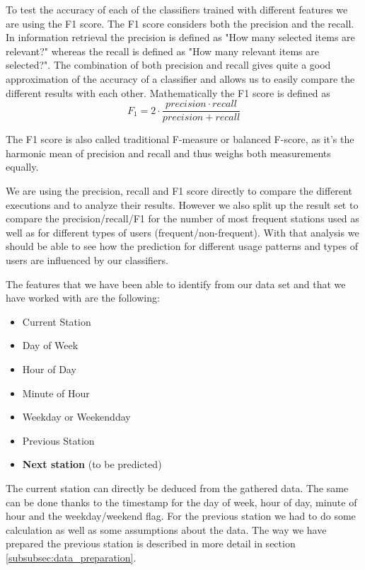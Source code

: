 To test the accuracy of each of the classifiers trained with different features we are using the F1 score. The F1 score considers both the precision and the recall. In information retrieval the precision is defined as "How many selected items are relevant?" whereas the recall is defined as "How many relevant items are selected?". The combination of both precision and recall gives quite a good approximation of the accuracy of a classifier and allows us to easily compare the different results with each other. Mathematically the F1 score is defined as 
\begin{equation}\label{equation:F1Score}
F_{1} = 2 \cdot \frac{precision \cdot recall}{precision + recall}
\end{equation}

The F1 score is also called traditional F-measure or balanced F-score, as it's the harmonic mean of precision and recall and thus weighs both measurements equally.

We are using the precision, recall and F1 score directly to compare the different executions and to analyze their results. However we also split up the result set to compare the precision/recall/F1 for the number of most frequent stations used as well as for different types of users (frequent/non-frequent). With that analysis we should be able to see how the prediction for different usage patterns and types of users are influenced by our classifiers.

The features that we have been able to identify from our data set and that we have worked with are the following:
\begin{itemize}
	\item Current Station
	\item Day of Week
	\item Hour of Day
	\item Minute of Hour
	\item Weekday or Weekendday
	\item Previous Station
	\item \textbf{Next station} (to be predicted)
\end{itemize}

The current station can directly be deduced from the gathered data. The same can be done thanks to the timestamp for the day of week, hour of day, minute of hour and the weekday/weekend flag. For the previous station we had to do some calculation as well as some assumptions about the data. The way we have prepared the previous station is described in more detail in section \ref{subsubsec:data_preparation}.  

